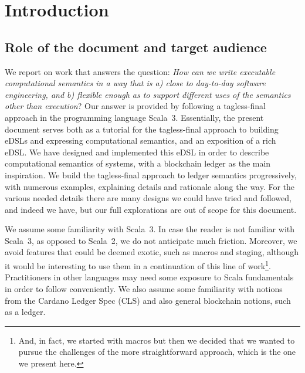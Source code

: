 \documentclass[11pt]{article}
\begin{document}
\clearpage
\tableofcontents

\section{Introduction}
\label{sec:intro}

\subsection{Role of the document and target audience}
We report on work that answers the question: \textit{How can we write 
executable computational semantics in a way that is a) close to day-to-day 
software engineering, and b) flexible enough as to support different uses of 
the semantics other than execution}? Our answer is provided by following a 
tagless-final approach \cite{tf:main:2009,tf:lecture:2012} in the programming 
language Scala~3.
Essentially, the present document serves both as a tutorial for the 
tagless-final approach to building eDSLs and expressing computational 
semantics, and an exposition of a rich eDSL. We have designed and implemented 
this eDSL in order to describe computational semantics of systems, with a 
blockchain ledger as the main inspiration. We build the tagless-final 
approach to ledger semantics progressively, with numerous examples, 
explaining details and rationale along the way. For the various needed 
details there are many designs we could have tried and followed, and indeed 
we have, but our full explorations are out of scope for this document.

We assume some familiarity with Scala~3. In case the reader is not familiar 
with Scala~3, as opposed to Scala~2, we do not anticipate much friction. 
Moreover, we avoid features that could be deemed exotic, such as macros and 
staging, although it would be interesting to use them in a continuation of 
this line of work\footnote{And, in fact, we started with macros but then we 
decided that we wanted to pursue the challenges of the more straightforward 
approach, which is the one we present here.}. Practitioners in other 
languages may need some exposure to Scala fundamentals in order to follow 
conveniently. We also assume some familiarity with notions from the Cardano 
Ledger Spec (CLS) \cite{cardano:ledger-spec:shelley:2019} and also general 
blockchain notions, such as a ledger.
\end{document}
